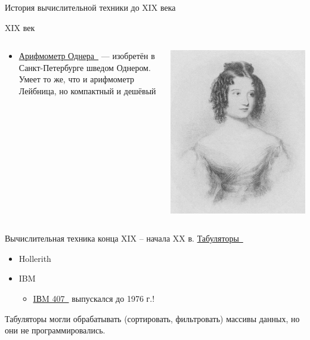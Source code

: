\documentclass[xetex,aspectratio=43]{beamer}
\begin{document}
\begin{frame}{История вычислительной техники до XIX века}
\begin{block}{XIX век}
\begin{columns}
\begin{column}{0.7\textwidth}
\begin{itemize}
				\item
				\href{https://en.wikipedia.org/wiki/Odhner_Arithmometer}{Арифмометр
					Однера~\extlink} --- изобретён в Санкт-Петербурге шведом Однером. Умеет то же,
				что и арифмометр Лейбница, но компактный и дешёвый
			\end{itemize}
		\end{column}
		\begin{column}{0.3\textwidth}
			\includegraphics[width=\textwidth]{img/02.Ada_Byron_aged_seventeen_1832.jpg}
		\end{column}
		\end{columns}
	\end{block}
\end{frame}

\begin{frame}{Вычислительная техника конца XIX -- начала XX в.}
	\href{https://en.wikipedia.org/wiki/Tabulating_machine}{Табуляторы~\extlink}
	
	\begin{itemize}
		\item
		Hollerith
		\item
		IBM
		
		\begin{itemize}
			\item
			\href{https://en.wikipedia.org/wiki/IBM_407}{IВM 407~\extlink} выпускался до
			1976 г.!
		\end{itemize}
	\end{itemize}
	
	Табуляторы могли обрабатывать (сортировать, фильтровать) массивы данных,
	но они не программировались.
\end{frame}
\end{document}
